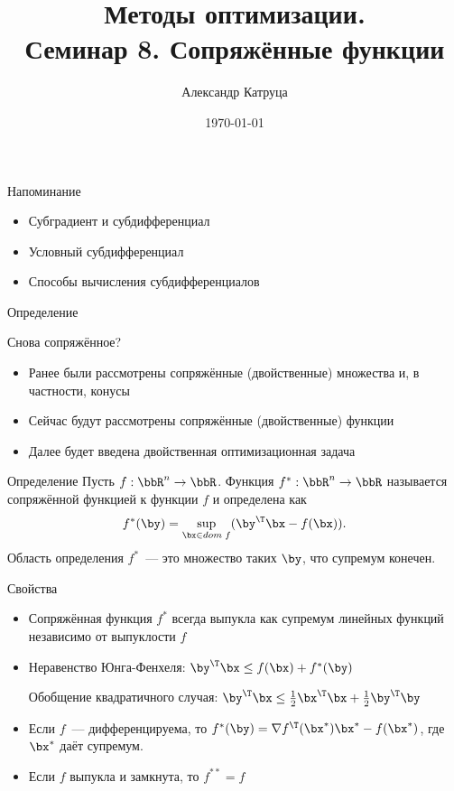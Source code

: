\documentclass[12pt]{beamer}
\title[Семинар 8]{Методы оптимизации. \\
 Семинар 8. Сопряжённые функции}
\author{Александр Катруца}
\institute{Московский физико-технический институт,\\
Факультет Управления и Прикладной Математики}
\date{\today}
\begin{document}
\begin{frame}
\maketitle
\end{frame}

\begin{frame}{Напоминание}
\begin{itemize}
\item Субградиент и субдифференциал
\item Условный субдифференциал
\item Способы вычисления субдифференциалов
\end{itemize}
\end{frame}

\begin{frame}{Определение}
\begin{block}{Снова сопряжённое?}
\begin{itemize}
\item Ранее были рассмотрены сопряжённые (двойственные) множества и, в частности, конусы
\item Сейчас будут рассмотрены сопряжённые (двойственные) функции
\item Далее будет введена двойственная оптимизационная задача 
\end{itemize}
\end{block}

\begin{block}{Определение}
Пусть $f: \bbR^n \rightarrow \bbR$. 
Функция $f^*: \bbR^n \rightarrow \bbR$ называется сопряжённой функцией к функции $f$ и определена как
\vspace{-4mm}
\[
f^*(\by) = \sup\limits_{\bx \in dom \; f} (\by^{\T}\bx - f(\bx)).
\vspace{-3mm}
\]
Область определения $f^*$~--- это множество таких $\by$, что супремум конечен. 

\end{block}
\end{frame}

\begin{frame}{Свойства}
\begin{itemize}
\item Сопряжённая функция $f^*$ всегда выпукла как супремум линейных функций независимо от выпуклости $f$
\item Неравенство Юнга-Фенхеля: $\by^{\T}\bx \leq f(\bx) + f^*(\by)$

Обобщение квадратичного случая: $\by^{\T}\bx \leq \frac{1}{2}\bx^{\T}\bx + \frac{1}{2}\by^{\T}\by$
\item Если $f$~--- дифференцируема, то $f^*(\by) = \nabla f^{\T}(\bx^*)\bx^* - f(\bx^*)$, где $\bx^*$ даёт супремум.
\item Если $f$ выпукла и замкнута, то $f^{**} = f$
\end{itemize}
\end{frame}
\end{document}
